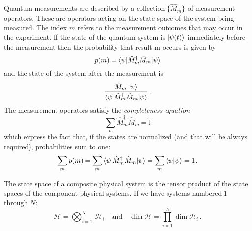 \begin{postulate}\label{postulate:3}
Quantum measurements are described by a collection $\{\hat{M}_m\}$ of
measurement operators. These are operators acting on the state space of the
system being measured. The index $m$ refers to the measurement outcomes that
may occur in the experiment. If the state of the quantum system is $\ket{\psi(t)}$
immediately before the measurement then the probability that result m occurs is given by
\begin{equation*}
    p(m) = \braket{ \psi | \hat{M}^\dagger_m \hat{M}_m | \psi}
\end{equation*}
and the state of the system after the measurement is
\begin{equation*}
    \frac{\hat{M}_m\ket{\psi}}{\braket{\psi | \hat{M}^\dagger_m \hat{M}_m | \psi}}\,.
\end{equation*}
The measurement operators satisfy the \emph{completeness equation}
\begin{equation*}
    \sum_m \hat{M}_m^\dagger \hat{M}_m = \hat{\mathbb{I}}
\end{equation*}
which express the fact that, if the states are normalized (and that will be always required), probabilities sum to one: 
    \begin{equation}\label{eq:normalization}
    \sum_m p(m) = \sum_m \braket{ \psi | \hat{M}^\dagger_m \hat{M}_m | \psi} = \sum_m \braket{\psi | \psi} = 1\,.
    \end{equation}
\end{postulate} 
\begin{postulate}\label{postulate:4}
The state space of a composite physical system is the tensor product
of the state spaces of the component physical systems. If we have systems numbered $1$ through $N$:
\begin{equation*}
   \mathcal{H} = \bigotimes_{i=1}^{N}\,\mathcal{H}_i \quad  \text{and} \quad \dim\mathcal{H} = \prod_{i=1}^N \dim\mathcal{H}_i\,.
\end{equation*}
\end{postulate}